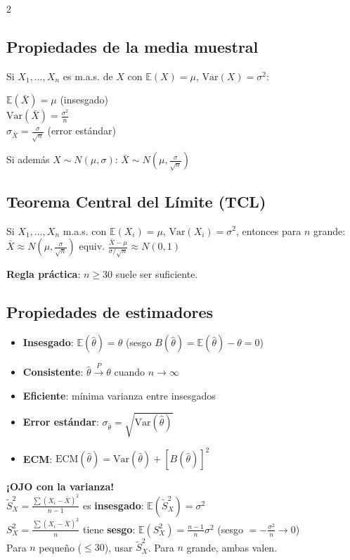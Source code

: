 \documentclass[9pt,a4paper]{article}
\newcommand{\E}{\mathbb{E}}
\newcommand{\Var}{\text{Var}}
\begin{document}
\begin{multicols}{2}
\subsection{Propiedades de la media muestral}
Si $X_1,\ldots,X_n$ es m.a.s. de $X$ con $\E(X)=\mu$, $\Var(X)=\sigma^2$:
\begin{formulabox}
$\E(\bar{X})=\mu$ \quad (insesgado)\\
$\Var(\bar{X})=\frac{\sigma^2}{n}$\\
$\sigma_{\bar{X}}=\frac{\sigma}{\sqrt{n}}$ \quad (error estándar)
\end{formulabox}

Si además $X\sim N(\mu,\sigma)$: $\bar{X}\sim N\left(\mu,\frac{\sigma}{\sqrt{n}}\right)$

\subsection{Teorema Central del Límite (TCL)}
\begin{formulabox}
Si $X_1,\ldots,X_n$ m.a.s. con $\E(X_i)=\mu$, $\Var(X_i)=\sigma^2$, entonces para $n$ grande:\\[3pt]
$\bar{X}\approx N\left(\mu,\frac{\sigma}{\sqrt{n}}\right)$ \quad equiv. \quad $\frac{\bar{X}-\mu}{\sigma/\sqrt{n}}\approx N(0,1)$
\end{formulabox}

\textbf{Regla práctica}: $n\geq 30$ suele ser suficiente.

\subsection{Propiedades de estimadores}
\begin{itemize}[leftmargin=*]
\item \textbf{Insesgado}: $\E(\hat{\theta})=\theta$ (sesgo $B(\hat{\theta})=\E(\hat{\theta})-\theta=0$)
\item \textbf{Consistente}: $\hat{\theta}\xrightarrow{P}\theta$ cuando $n\to\infty$
\item \textbf{Eficiente}: mínima varianza entre insesgados
\item \textbf{Error estándar}: $\sigma_{\hat{\theta}}=\sqrt{\Var(\hat{\theta})}$
\item \textbf{ECM}: $\text{ECM}(\hat{\theta})=\Var(\hat{\theta})+[B(\hat{\theta})]^2$
\end{itemize}

\begin{alertbox}
\textbf{¡OJO con la varianza!}\\
$\tilde{S}^2_X=\frac{\sum(X_i-\bar{X})^2}{n-1}$ es \textbf{insesgado}: $\E(\tilde{S}^2_X)=\sigma^2$\\
$S^2_X=\frac{\sum(X_i-\bar{X})^2}{n}$ tiene \textbf{sesgo}: $\E(S^2_X)=\frac{n-1}{n}\sigma^2$ (sesgo $=-\frac{\sigma^2}{n}\to 0$)\\
Para $n$ pequeño ($\leq 30$), usar $\tilde{S}^2_X$. Para $n$ grande, ambas valen.
\end{alertbox}


\end{multicols}
\end{document}
